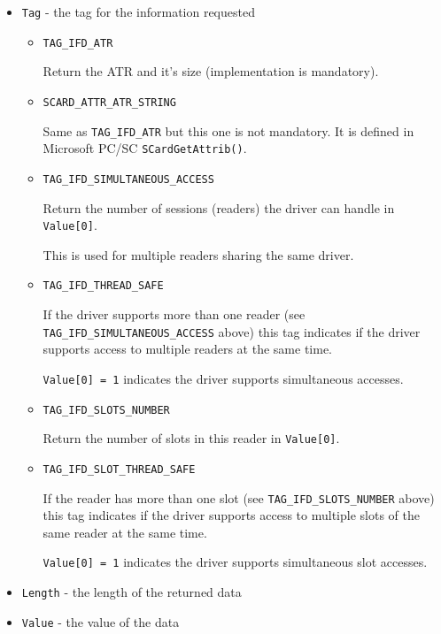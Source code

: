 \documentclass[a4paper,12pt]{article}
\begin{document}
\begin{itemize}
\item \texttt{Tag} - the tag for the information requested

\begin{itemize}
\item \texttt{TAG\_IFD\_ATR}

Return the ATR and it's size (implementation is mandatory).

\item \texttt{SCARD\_ATTR\_ATR\_STRING}

Same as \texttt{TAG\_IFD\_ATR} but this one is not mandatory. It is
defined in Microsoft PC/SC \texttt{SCardGetAttrib()}.

\item \texttt{TAG\_IFD\_SIMULTANEOUS\_ACCESS}

Return the number of sessions (readers) the driver can handle in
\texttt{Value[0]}.

This is used for multiple readers sharing the same driver.

\item \texttt{TAG\_IFD\_THREAD\_SAFE}

If the driver supports more than one reader (see
\texttt{TAG\_IFD\_SIMULTANEOUS\_ACCESS} above) this tag indicates if the
driver supports access to multiple readers at the same time.

\texttt{Value[0] = 1} indicates the driver supports simultaneous
accesses.

\item \texttt{TAG\_IFD\_SLOTS\_NUMBER}

Return the number of slots in this reader in \texttt{Value[0]}.

\item \texttt{TAG\_IFD\_SLOT\_THREAD\_SAFE}

If the reader has more than one slot (see
\texttt{TAG\_IFD\_SLOTS\_NUMBER} above) this tag indicates if the driver
supports access to multiple slots of the same reader at the same time.

\texttt{Value[0] = 1} indicates the driver supports simultaneous slot
accesses.

\end{itemize}

\item \texttt{Length} - the length of the returned data

\item \texttt{Value} - the value of the data

\end{itemize}
\end{document}
